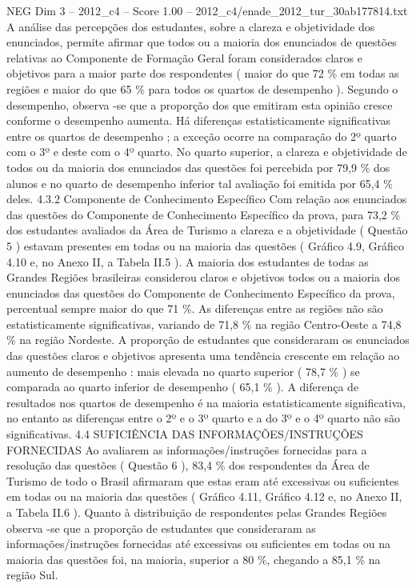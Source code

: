 \begin{textsample}{NEG Dim 3 – 2012\_c4 – Score 1.00 – 2012\_c4/enade\_2012\_tur\_30ab177814.txt}
A análise das percepções dos estudantes, sobre a clareza e objetividade dos enunciados, permite afirmar que todos ou a maioria dos enunciados de questões relativas ao Componente de Formação Geral foram considerados claros e objetivos para a maior parte dos respondentes ( maior do que 72 \% em todas as regiões e maior do que 65 \% para todos os quartos de desempenho ).
Segundo o desempenho, observa -se que a proporção dos que emitiram esta opinião cresce conforme o desempenho aumenta.
Há diferenças estatisticamente significativas entre os quartos de desempenho ; a exceção ocorre na comparação do 2º quarto com o 3º e deste com o 4º quarto.
No quarto superior, a clareza e objetividade de todos ou da maioria dos enunciados das questões foi percebida por 79,9 \% dos alunos e no quarto de desempenho inferior tal avaliação foi emitida por 65,4 \% deles. 4.3.2 Componente de Conhecimento Específico Com relação aos enunciados das questões do Componente de Conhecimento Específico da prova, para 73,2 \% dos estudantes avaliados da Área de Turismo a clareza e a objetividade ( Questão 5 ) estavam presentes em todas ou na maioria das questões ( Gráfico 4.9, Gráfico 4.10 e, no Anexo II, a Tabela II.5 ).
A maioria dos estudantes de todas as Grandes Regiões brasileiras considerou claros e objetivos todos ou a maioria dos enunciados das questões do Componente de Conhecimento Específico da prova, percentual sempre maior do que 71 \%.
As diferenças entre as regiões não são estatisticamente significativas, variando de 71,8 \% na região Centro-Oeste a 74,8 \% na região Nordeste.
A proporção de estudantes que consideraram os enunciados das questões claros e objetivos apresenta uma tendência crescente em relação ao aumento de desempenho : mais elevada no quarto superior ( 78,7 \% ) se comparada ao quarto inferior de desempenho ( 65,1 \% ).
A diferença de resultados nos quartos de desempenho é na maioria estatisticamente significativa, no entanto as diferenças entre o 2º e o 3º quarto e a do 3º e o 4º quarto não são significativas. 4.4 SUFICIÊNCIA DAS INFORMAÇÕES/INSTRUÇÕES FORNECIDAS Ao avaliarem as informações/instruções fornecidas para a resolução das questões ( Questão 6 ), 83,4 \% dos respondentes da Área de Turismo de todo o Brasil afirmaram que estas eram até excessivas ou suficientes em todas ou na maioria das questões ( Gráfico 4.11, Gráfico 4.12 e, no Anexo II, a Tabela II.6 ).
Quanto à distribuição de respondentes pelas Grandes Regiões observa -se que a proporção de estudantes que consideraram as informações/instruções fornecidas até excessivas ou suficientes em todas ou na maioria das questões foi, na maioria, superior a 80 \%, chegando a 85,1 \% na região Sul.

\end{textsample}
